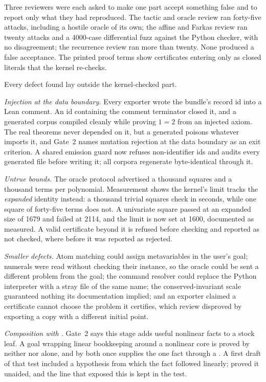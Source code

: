 Three reviewers were each asked to make one part accept something false and to
report only what they had reproduced. The tactic and oracle review ran
forty-five attacks, including a hostile oracle of its own; the affine and Farkas
review ran twenty attacks and a 4000-case differential fuzz against the Python
checker, with no disagreement; the recurrence review ran more than twenty. None
produced a false acceptance. The printed proof terms show certificates entering
only as closed literals that the kernel re-checks.

Every defect found lay outside the kernel-checked part.

\emph{Injection at the data boundary.} Every exporter wrote the bundle's record
id into a Lean comment. An id containing the comment terminator closed it, and a
generated corpus compiled cleanly while proving $1 = 2$ from an injected axiom.
The real theorems never depended on it, but a generated  poisons whatever imports it, and Gate~2 names mutation rejection at the
data boundary as an exit criterion. A shared emission guard now refuses
non-identifier ids and audits every generated file before writing it; all
corpora regenerate byte-identical through it.

\emph{Untrue bounds.} The oracle protocol advertised a thousand squares and a
thousand terms per polynomial. Measurement shows the kernel's limit tracks the
\emph{expanded} identity instead: a thousand trivial squares check in seconds,
while one square of forty-five terms does not. A univariate square passed at an
expanded size of 1679 and failed at 2114, and the limit is now set at 1600,
documented as measured. A valid certificate beyond it is refused before checking
and reported as not checked, where before it was reported as rejected.

\emph{Smaller defects.} Atom matching could assign metavariables in the user's
goal; numerals were read without checking their instance, so the oracle could be
sent a different problem from the goal; the command resolver could replace the
Python interpreter with a stray file of the same name; the conserved-invariant
scale guaranteed nothing its documentation implied; and an exporter claimed a
certificate cannot choose the problem it certifies, which review disproved by
exporting a copy with a different initial point.

\emph{Composition with .} Gate~2 says this stage adds useful
nonlinear facts to a stock  leaf. A goal wrapping linear
bookkeeping around a nonlinear core is proved by neither  nor
 alone, and by both once  supplies the one fact
through a . A first draft of that test included a hypothesis from
which the fact followed linearly;  proved it unaided, and the
 line that exposed this is kept in the test.

